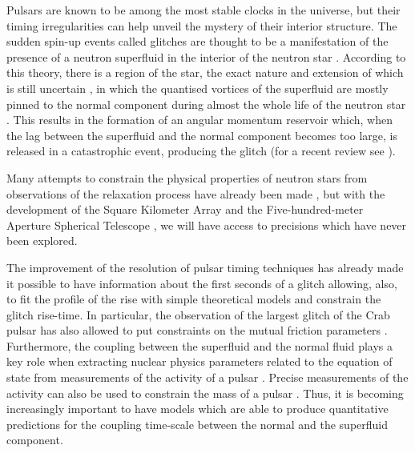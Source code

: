 \documentclass[usenatbib%
]{mnras}
\begin{document}
Pulsars are known to be among the most stable clocks in the universe, but their timing irregularities can help unveil the mystery of their interior structure. The sudden spin-up events called glitches are thought to be a manifestation of the presence of a neutron superfluid in the interior of the neutron star \citep{andersonitoh1975}. According to this theory, there is a region of the star, the exact nature and extension of which is still uncertain  \citep{andersson+2012,chamel2013}, in which the quantised vortices of the superfluid are mostly pinned to the normal component during almost the whole life of the neutron star \citep{alpar77,epsteinbaym88}. This results in the formation of an angular momentum reservoir which, when the lag between the superfluid and the normal component becomes too large, is released in a catastrophic event, producing the glitch (for a recent review see \citealt{haskellmelatos2015}).  

Many attempts to constrain the physical properties of neutron stars from observations of the relaxation process have already been made \citep{baym+1969,datta1993,LE99,graber2018ApJ}, but with the development of the Square Kilometer Array \citep{Lazio2009,SKAtuttiinsieme2018} and the Five-hundred-meter Aperture Spherical Telescope \citep{Nan2011}, we will have access to precisions which have never been explored. 

The improvement of the resolution of pulsar timing techniques has already made it possible to have information about the first seconds of a glitch \citep{PalfreymanVela} allowing, also, to fit the profile of the rise with simple theoretical models \citep{ashton2019rotational,pizzochero2019core} and constrain the glitch rise-time. In particular, the observation of the largest glitch of the Crab pulsar \citep{shaw+2018} has also allowed to put constraints on the mutual friction parameters \citep{Haskell2018Crab}. 
Furthermore, the coupling between the superfluid and the normal fluid plays a key role when extracting nuclear physics parameters related to the equation of state from measurements of the activity of a pulsar \citep{NewtonBergerHaskell2015}. Precise measurements of the activity can also be used  to constrain the mass of a pulsar \citep{Ho_2015,pizzochero+2017}. 
Thus, it is becoming increasingly important to have models which are able to produce quantitative predictions for the coupling time-scale between the normal and the superfluid component.  
\end{document}

